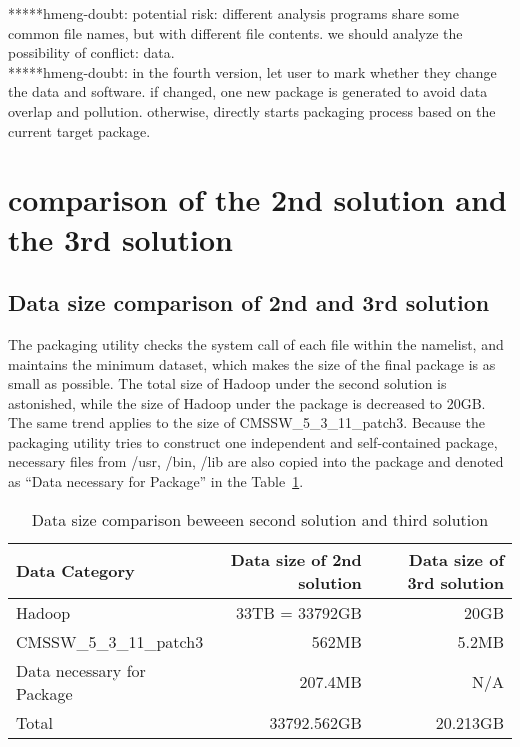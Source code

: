 \documentclass{article}
\begin{document}
*****hmeng-doubt: potential risk: different analysis programs share some common file names, but with different file contents. we should analyze the possibility of conflict: data.\\

*****hmeng-doubt: in the fourth version, let user to mark whether they change the data and software. if changed, one new package is generated to avoid data overlap and pollution. otherwise, directly starts packaging process based on the current target package. 

\section{comparison of the 2nd solution and the 3rd solution}

\subsection{ Data size comparison of 2nd and 3rd solution}
\indent The packaging utility checks the system call of each file within the namelist, and maintains the minimum dataset, which makes the size of the final package is as small as possible. The total size of Hadoop under the second solution is astonished, while the size of Hadoop under the package is decreased to 20GB. The same trend applies to the size of CMSSW\_5\_3\_11\_patch3. Because the packaging utility tries to construct one independent and self-contained package, necessary files  from /usr, /bin, /lib are also copied into the package and denoted as “Data necessary for Package” in the Table~\ref{table:datasize-2nd3rd}.

\begin{table}
    \centering
    \begin{tabular}{|l|r|r|}
    \hline
     Data Category & Data size of 2nd solution & Data size of 3rd solution \\ \hline
     Hadoop & 33TB = 33792GB & 20GB \\ \hline
     CMSSW\_5\_3\_11\_patch3 & 562MB & 5.2MB \\ \hline
     Data necessary for Package & 207.4MB & N/A \\ \hline
     Total & 33792.562GB & 20.213GB \\ \hline
    \end{tabular}
    \caption{Data size comparison beweeen second solution and third solution}
    \label{table:datasize-2nd3rd}
\end{table}
\end{document}
